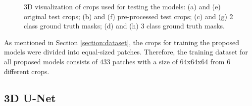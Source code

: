 \begin{figure}[!htb]
\hfil 
{}\hfil
{}\hfil
{}
\caption{\ac{3D} visualization of crops used for testing the models: (a) and (e) original test crops; (b) and (f) pre-processed test crops; (c) and (g) 2 class ground truth masks; (d) and (h) 3 class ground truth masks.}

\label{fig:dataset}

\end{figure}

As mentioned in Section \ref{section:dataset}, the crops for training the proposed models were divided into equal-sized patches. Therefore, the training dataset for all proposed models consists of 433 patches with a size of 64x64x64 from 6 different crops.

\subsection{3D U-Net}

